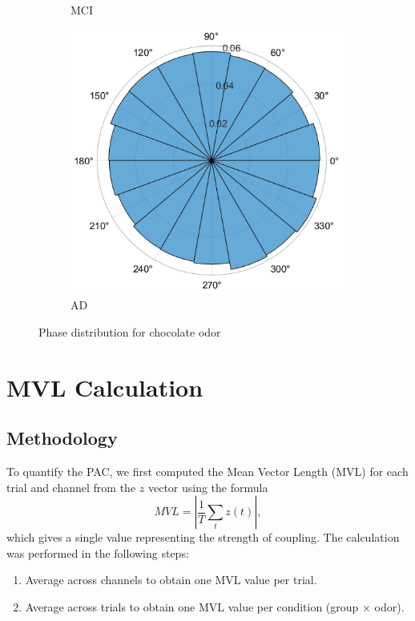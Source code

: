 \documentclass[hidelinks,12pt]{article}
\begin{document}
\begin{figure}[bh!]
\begin{subfigure}[b]{0.3\textwidth}
			\caption{MCI}
		\end{subfigure}
		\hfill
		\begin{subfigure}[b]{0.3\textwidth}
			\centering
			\includegraphics[width=\textwidth]{9}
			\caption{AD}
		\end{subfigure}
		
		\caption{Phase distribution for chocolate odor}
	\end{figure}
	
	
	\newpage
	
	\section{MVL Calculation}
	\subsection{Methodology}
	To quantify the PAC, we first computed the Mean Vector Length (MVL) for each trial and channel from the $z$ vector using the formula
	\[
	MVL = \left| \frac{1}{T} \sum_{t} z(t) \right|,
	\]
	which gives a single value representing the strength of coupling. The calculation was performed in the following steps:
	\begin{enumerate}
		\item Average across channels to obtain one MVL value per trial.
		\item Average across trials to obtain one MVL value per condition (group $\times$ odor).
	\end{enumerate}
	
\end{document}
